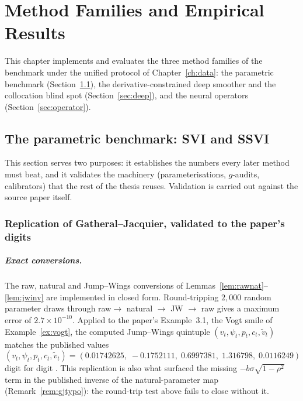 \chapter{Method Families and Empirical Results}\label{ch:methods}
This chapter implements and evaluates the three method families of the benchmark under the
unified protocol of Chapter~\ref{ch:data}: the parametric benchmark
(Section~\ref{sec:parametric}), the derivative-constrained deep smoother and the collocation
blind spot (Section~\ref{sec:deep}), and the neural operators (Section~\ref{sec:operator}).

\section{The parametric benchmark: SVI and SSVI}\label{sec:parametric}
This section serves two purposes: it establishes the numbers every later method must beat, and
it validates the machinery (parameterisations, $g$-audits, calibrators) that the rest of the
thesis reuses. Validation is carried out against the source paper itself.

\subsection{Replication of Gatheral--Jacquier, validated to the paper's digits}

\paragraph{Exact conversions.} The raw, natural and Jump--Wings conversions of
Lemmas~\ref{lem:rawnat}--\ref{lem:jwinv} are implemented in closed form. Round-tripping
$2{,}000$ random parameter draws through raw$\to$ natural $\to$ JW $\to$ raw gives a maximum error of
$2.7\times10^{-10}$. Applied to the paper's Example~3.1, the Vogt smile of
Example~\ref{ex:vogt}, the computed Jump--Wings quintuple
$(v_t,\psi_t,p_t,c_t,\tilde v_t)$ matches the published values
\begin{equation}\label{eq:vogtjw}
(v_t,\psi_t,p_t,c_t,\tilde v_t)=
(0.01742625,\;-0.1752111,\;0.6997381,\;1.316798,\;0.0116249)
\end{equation}
digit for digit . This replication is also what surfaced the missing
$-b\sigma\sqrt{1-\rho^{2}}$ term in the published inverse of the natural-parameter map
(Remark~\ref{rem:gjtypo}): the round-trip test above fails to close without it.

